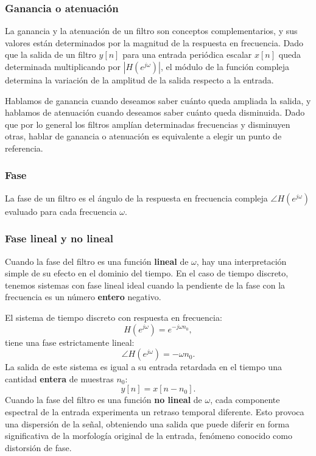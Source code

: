 \subsubsection{Ganancia o atenuaci\'{o}n}

La ganancia y la atenuaci\'{o}n de un filtro son conceptos complementarios, y sus valores est\'{a}n determinados por la magnitud de la respuesta en frecuencia. Dado que la salida de un filtro $y[n]$ para una entrada peri\'{o}dica escalar $x[n]$ queda determinada multiplicando por $|H(e^{j\omega})|$, el m\'{o}dulo de la funci\'{o}n compleja determina la variaci\'{o}n de la amplitud de la salida respecto a la entrada. 

Hablamos de ganancia cuando deseamos saber cu\'{a}nto queda ampliada la salida, y hablamos de atenuaci\'{o}n cuando deseamos saber cu\'{a}nto queda disminuida. Dado que por lo general los filtros ampl\'{i}an determinadas frecuencias y disminuyen otras, hablar de ganancia o atenuaci\'{o}n es equivalente a elegir un punto de referencia.

\subsubsection{Fase}

La fase de un filtro es el ángulo de la respuesta en frecuencia compleja $\angle H(e^{j\omega})$ evaluado para cada frecuencia $\omega$.

\subsubsection{Fase lineal y no lineal}

Cuando la fase del filtro es una funci\'{o}n \textbf{lineal} de $\omega$, hay una interpretaci\'{o}n simple de su efecto en el dominio del tiempo. En el caso de tiempo discreto, tenemos sistemas con fase lineal ideal cuando la pendiente de la fase con la frecuencia es un n\'{u}mero \textbf{entero} negativo. 

El sistema de tiempo discreto con respuesta en frecuencia:
\begin{equation}
	H(e^{j\omega}) = e^{-j\omega n_{0}},
\end{equation}
tiene una fase estrictamente lineal:
\begin{equation}
	\angle H(e^{j\omega}) = -\omega n_{0}.
\end{equation}
La salida de este sistema es igual a su entrada retardada en el tiempo una cantidad \textbf{entera} de muestras $n_{0}$:
\begin{equation}
	y[n] = x[n - n_{0}].
\end{equation}
Cuando la fase del filtro es una funci\'{o}n \textbf{no lineal} de $\omega$, cada componente espectral de la entrada experimenta un retraso temporal diferente. Esto provoca una dispersión de la señal, obteniendo una salida que puede diferir en forma significativa de la morfología original de la entrada, fenómeno conocido como distorsión de fase.

